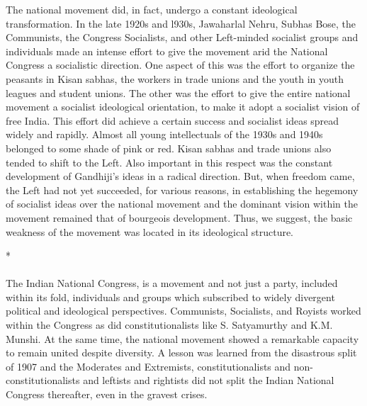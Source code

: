 \begin{multicols}{2}
The national movement did, in fact, undergo a constant ideological transformation. In the late 1920s and l930s, Jawaharlal Nehru, Subhas Bose, the Communists, the Congress Socialists, and other Left-minded socialist groups and individuals made an intense effort to give the movement arid the National Congress a socialistic direction. One aspect of this was the effort to organize the peasants in Kisan sabhas, the workers in trade unions and the youth in youth leagues and student unions. The other was the effort to give the entire national movement a socialist ideological orientation, to make it adopt a socialist vision of free India. This effort did achieve a certain success and socialist ideas spread widely and rapidly. Almost all young intellectuals of the 1930s and 1940s belonged to some shade of pink or red. Kisan sabhas and trade unions also tended to shift to the Left. Also important in this respect was the constant development of Gandhiji's ideas in a radical direction. But, when freedom came, the Left had not yet succeeded, for various reasons, in establishing the hegemony of socialist ideas over the national movement and the dominant vision within the movement remained that of bourgeois development. Thus, we suggest, the basic weakness of the movement was located in its ideological structure.

\begin{center}*\end{center}

\paragraph*{}
The Indian National Congress, is a movement and not just a party, included within its fold, individuals and groups which subscribed to widely divergent political and ideological perspectives. Communists, Socialists, and Royists worked within the Congress as did constitutionalists like S. Satyamurthy and K.M. Munshi. At the same time, the national movement showed a remarkable capacity to remain united despite diversity. A lesson was learned from the disastrous split of 1907 and the Moderates and Extremists, constitutionalists and non-constitutionalists and leftists and rightists did not split the Indian National Congress thereafter, even in the gravest crises.


\end{multicols}
